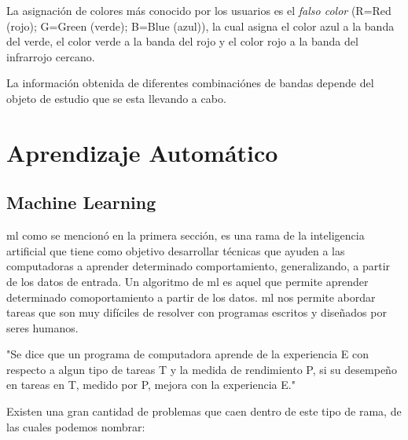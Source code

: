 La asignación de colores más conocido por los usuarios es el \textit{falso color} (R=Red (rojo); G=Green (verde); B=Blue (azul)), la cual asigna el color azul a la banda del verde, el color verde a la banda del rojo y el color rojo a la banda del infrarrojo cercano. 

La información obtenida de diferentes combinaciónes de bandas depende del objeto de estudio que se esta llevando a cabo.


\section{Aprendizaje Automático}

\subsection{Machine Learning}
\ac{ml} como se mencionó en la primera sección, es una rama de la inteligencia artificial que tiene como objetivo desarrollar técnicas que ayuden a las computadoras a aprender determinado comportamiento, generalizando, a partir de los datos de entrada. Un algoritmo de \ac{ml} es aquel que permite aprender determinado comoportamiento a partir de los datos. \ac{ml} nos permite abordar tareas que son muy difíciles de resolver con programas escritos y diseñados por seres humanos.

"Se dice que un programa de computadora aprende de la experiencia E con respecto a algun tipo de tareas T y la medida de rendimiento P, si su desempeño en tareas en T, medido por P, mejora con la experiencia E." \citep{Tom michell}

Existen una gran cantidad de problemas que caen dentro de este tipo de rama, de las cuales podemos nombrar:

